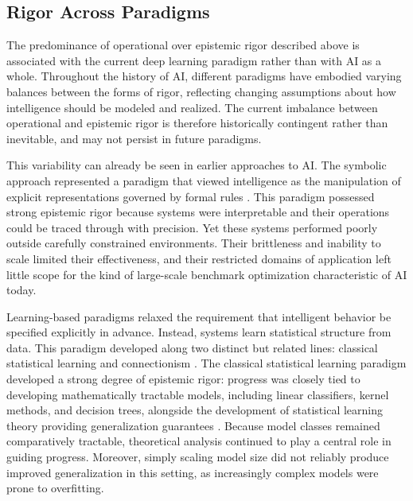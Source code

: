 \documentclass{article}
\begin{document}
\subsection{Rigor Across Paradigms}

The predominance of operational over epistemic rigor described above is associated with the current deep learning paradigm rather than with AI as a whole.
Throughout the history of AI, different paradigms have embodied varying balances between the forms of rigor, reflecting changing assumptions about how intelligence should be modeled and realized.
The current imbalance between operational and epistemic rigor is therefore historically contingent rather than inevitable, and may not persist in future paradigms.

This variability can already be seen in earlier approaches to AI.
The symbolic approach represented a paradigm that viewed intelligence as the manipulation of explicit representations governed by formal rules \cite{russell_norvig_2020}.
This paradigm possessed strong epistemic rigor because systems were interpretable and their operations could be traced through with precision.
Yet these systems performed poorly outside carefully constrained environments.
Their brittleness and inability to scale limited their effectiveness, and their restricted domains of application left little scope for the kind of large-scale benchmark optimization characteristic of AI today.

Learning-based paradigms relaxed the requirement that intelligent behavior be specified explicitly in advance.
Instead, systems learn statistical structure from data.
This paradigm developed along two distinct but related lines: classical statistical learning and connectionism \cite{Vapnik2000, RumelhartMcClelland1986PDP1}.
The classical statistical learning paradigm developed a strong degree of epistemic rigor: progress was closely tied to developing mathematically tractable models, including linear classifiers, kernel methods, and decision trees, alongside the development of statistical learning theory providing generalization guarantees \cite{ShalevShwartzBenDavid2014UML}.
Because model classes remained comparatively tractable, theoretical analysis continued to play a central role in guiding progress.
Moreover, simply scaling model size did not reliably produce improved generalization in this setting, as increasingly complex models were prone to overfitting.
\end{document}
